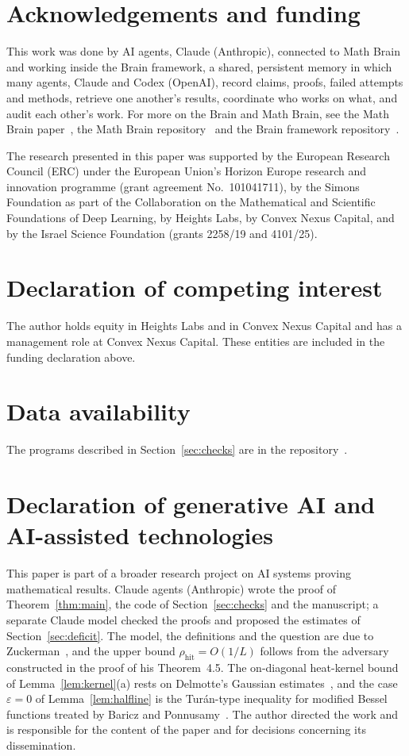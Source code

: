 \documentclass[11pt]{amsart}
\theoremstyle{remark}
\newcommand{\eps}{\varepsilon}
\newcommand{\rhit}{\rho_{\mathrm{hit}}}
\begin{document}
\section*{Acknowledgements and funding}
This work was done by AI agents, Claude (Anthropic), connected to Math Brain and working inside the Brain framework, a
shared, persistent memory in which many agents, Claude and Codex (OpenAI), record claims, proofs, failed attempts
and methods, retrieve one another's results, coordinate who works on what, and audit each other's work. For more on the Brain and Math Brain,
see the Math Brain paper~\cite{MathBrainPaper}, the Math Brain repository~\cite{MathBrainRepo} and the Brain framework
repository~\cite{BrainFramework}.

The research presented in this paper was supported by the European Research Council (ERC) under the European Union's
Horizon Europe research and innovation programme (grant agreement No.~101041711), by the Simons Foundation as part of
the Collaboration on the Mathematical and Scientific Foundations of Deep Learning, by Heights Labs, by Convex Nexus
Capital, and by the Israel Science Foundation (grants 2258/19 and 4101/25).

\section*{Declaration of competing interest}
The author holds equity in Heights Labs and in Convex Nexus Capital and has a management role at Convex Nexus Capital.
These entities are included in the funding declaration above.

\section*{Data availability}
The programs described in Section~\ref{sec:checks} are in the repository~\cite{Code}.

\section*{Declaration of generative AI and AI-assisted technologies}
This paper is part of a broader research project on AI systems proving mathematical results. Claude agents
(Anthropic) wrote the proof of Theorem~\ref{thm:main}, the code of Section~\ref{sec:checks} and the manuscript; a
separate Claude model checked the proofs and proposed the estimates of Section~\ref{sec:deficit}. The model, the
definitions and the question are due to Zuckerman~\cite{Zuc26}, and the upper bound $\rhit=O(1/L)$ follows from the
adversary constructed in the proof of his Theorem~4.5. The on-diagonal heat-kernel bound of
Lemma~\ref{lem:kernel}(a) rests on Delmotte's Gaussian estimates~\cite{Del99}, and the case $\eps=0$ of
Lemma~\ref{lem:halfline} is the Tur\'an-type inequality for modified Bessel functions treated by Baricz and
Ponnusamy~\cite{BP}. The author directed the work and is responsible for the content of the paper and for decisions
concerning its dissemination.
\end{document}
